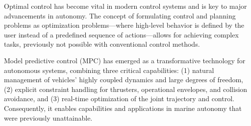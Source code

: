 
Optimal control has become vital in modern control systems and is key to major advancements in autonomy. The concept of formulating control and planning problems as optimization problems—where high-level behavior is defined by the user instead of a predefined sequence of actions—allows for achieving complex tasks, previously not possible with conventional control methods. 

Model predictive control (MPC) has emerged as a transformative technology for autonomous systems, combining three critical capabilities: (1) natural management of vehicles' highly coupled dynamics and large degrees of freedom, (2) explicit constraint handling for thrusters, operational envelopes, and collision avoidance, and (3) real-time optimization of the joint trajectory and control. Consequently, it enables capabilities and applications in marine autonomy that were previously unattainable.



    

    
    

    
